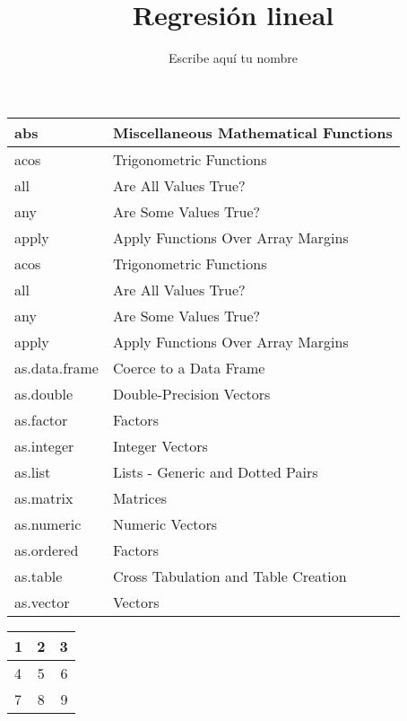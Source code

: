 \documentclass{article}
\title{Regresi\'on lineal}
\author{Escribe aqu\'i tu nombre}
\begin{document}

\maketitle

\begin{center}
   \begin{tabular}{| l | l | }
     \hline
abs & Miscellaneous Mathematical Functions \\ \hline
acos &	Trigonometric Functions \\ \hline
all &	Are All Values True? \\ \hline
any &	Are Some Values True? \\ \hline
apply &	Apply Functions Over Array Margins \\ \hline
acos &	Trigonometric Functions \\ \hline
all &	Are All Values True? \\ \hline
any &	Are Some Values True? \\ \hline
apply &	Apply Functions Over Array Margins \\ \hline
as.data.frame &	Coerce to a Data Frame \\ \hline
as.double &	Double-Precision Vectors \\ \hline
as.factor &	Factors \\ \hline
as.integer	& Integer Vectors \\ \hline
as.list &	Lists - Generic and Dotted Pairs \\ \hline
as.matrix & Matrices \\ \hline
as.numeric &	Numeric Vectors \\ \hline
as.ordered &	Factors \\ \hline
as.table &	Cross Tabulation and Table Creation \\ \hline
as.vector	& Vectors \\ \hline
   \end{tabular}
 \end{center}
 

\begin{center}
   \begin{tabular}{| l | c | r | }
     \hline
     1 & 2 & 3 \\ \hline
     4 & 5 & 6 \\ \hline
     7 & 8 & 9 \\
     \hline
   \end{tabular}
 \end{center}
\end{document}
